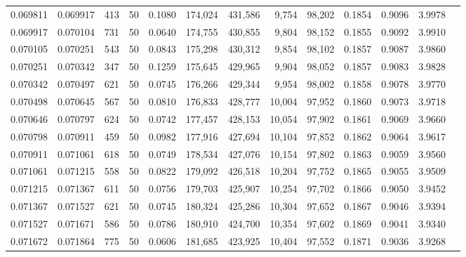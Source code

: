 \begin{tabular}{rrrrrrrrrrrrr}
0.069811 & 0.069917 &   413 &  50 &                                     0.1080 & 174,024 & 431,586 &   9,754 &  98,202 & 0.1854 & 0.9096 & 3.9978 \\
0.069917 & 0.070104 &   731 &  50 &                                     0.0640 & 174,755 & 430,855 &   9,804 &  98,152 & 0.1855 & 0.9092 & 3.9910 \\
0.070105 & 0.070251 &   543 &  50 &                                     0.0843 & 175,298 & 430,312 &   9,854 &  98,102 & 0.1857 & 0.9087 & 3.9860 \\
0.070251 & 0.070342 &   347 &  50 &                                     0.1259 & 175,645 & 429,965 &   9,904 &  98,052 & 0.1857 & 0.9083 & 3.9828 \\
0.070342 & 0.070497 &   621 &  50 &                                     0.0745 & 176,266 & 429,344 &   9,954 &  98,002 & 0.1858 & 0.9078 & 3.9770 \\
0.070498 & 0.070645 &   567 &  50 &                                     0.0810 & 176,833 & 428,777 &  10,004 &  97,952 & 0.1860 & 0.9073 & 3.9718 \\
0.070646 & 0.070797 &   624 &  50 &                                     0.0742 & 177,457 & 428,153 &  10,054 &  97,902 & 0.1861 & 0.9069 & 3.9660 \\
0.070798 & 0.070911 &   459 &  50 &                                     0.0982 & 177,916 & 427,694 &  10,104 &  97,852 & 0.1862 & 0.9064 & 3.9617 \\
0.070911 & 0.071061 &   618 &  50 &                                     0.0749 & 178,534 & 427,076 &  10,154 &  97,802 & 0.1863 & 0.9059 & 3.9560 \\
0.071061 & 0.071215 &   558 &  50 &                                     0.0822 & 179,092 & 426,518 &  10,204 &  97,752 & 0.1865 & 0.9055 & 3.9509 \\
0.071215 & 0.071367 &   611 &  50 &                                     0.0756 & 179,703 & 425,907 &  10,254 &  97,702 & 0.1866 & 0.9050 & 3.9452 \\
0.071367 & 0.071527 &   621 &  50 &                                     0.0745 & 180,324 & 425,286 &  10,304 &  97,652 & 0.1867 & 0.9046 & 3.9394 \\
0.071527 & 0.071671 &   586 &  50 &                                     0.0786 & 180,910 & 424,700 &  10,354 &  97,602 & 0.1869 & 0.9041 & 3.9340 \\
0.071672 & 0.071864 &   775 &  50 &                                     0.0606 & 181,685 & 423,925 &  10,404 &  97,552 & 0.1871 & 0.9036 & 3.9268 \\

\end{tabular}
